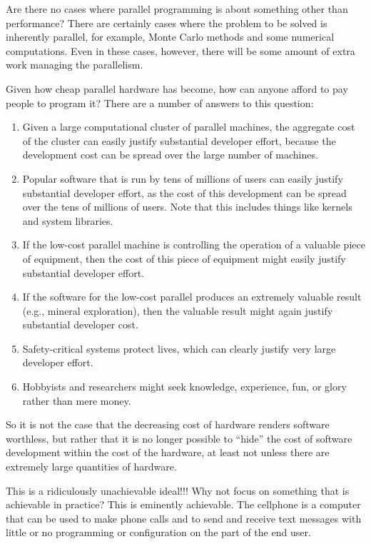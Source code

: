 \QuickQ{}
	Are there no cases where parallel programming is about something
	other than performance?
\QuickA{}
	There are certainly cases where the problem to be solved is
	inherently parallel, for example, Monte Carlo methods and
	some numerical computations.
	Even in these cases, however, there will be some amount of
	extra work managing the parallelism.

\QuickQ{}
	Given how cheap parallel hardware has become, how can anyone
	afford to pay people to program it?
\QuickA{}
	There are a number of answers to this question:
	\begin{enumerate}
	\item	Given a large computational cluster of parallel machines,
		the aggregate cost of the cluster can easily justify
		substantial developer effort, because the development
		cost can be spread over the large number of machines.
	\item	Popular software that is run by tens of millions of users
		can easily justify substantial developer effort,
		as the cost of this development can be spread over the tens
		of millions of users.
		Note that this includes things like kernels and system
		libraries.
	\item	If the low-cost parallel machine is controlling the operation
		of a valuable piece of equipment, then the cost of this
		piece of equipment might easily justify substantial
		developer effort.
	\item	If the software for the low-cost parallel produces an
		extremely valuable result (e.g., mineral exploration),
		then the valuable result might again justify substantial
		developer cost.
	\item	Safety-critical systems protect lives, which can clearly
		justify very large developer effort.
	\item	Hobbyists and researchers might seek knowledge, experience,
		fun, or glory rather than mere money.
	\end{enumerate}
	So it is not the case that the decreasing cost of hardware renders
	software worthless, but rather that it is no longer possible to
	``hide'' the cost of software development within the cost of
	the hardware, at least not unless there are extremely large
	quantities of hardware.

\QuickQ{}
	This is a ridiculously unachievable ideal!!!
	Why not focus on something that is achievable in practice?
\QuickA{}
	This is eminently achievable.
	The cellphone is a computer that can be used to make phone
	calls and to send and receive text messages with little or
	no programming or configuration on the part of the end user.


